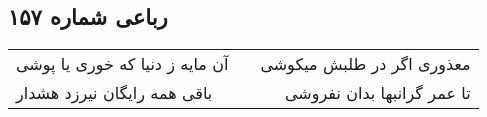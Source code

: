 \begin{center}
\section*{رباعی شماره ۱۵۷}
\label{sec:sh157}
\begin{longtable}{l p{0.5cm} r}
آن مایه ز دنیا که خوری یا پوشی
&&
معذوری اگر در طلبش میکوشی
\\
باقی همه رایگان نیرزد هشدار
&&
تا عمر گرانبها بدان نفروشی
\\
\end{longtable}
\end{center}
